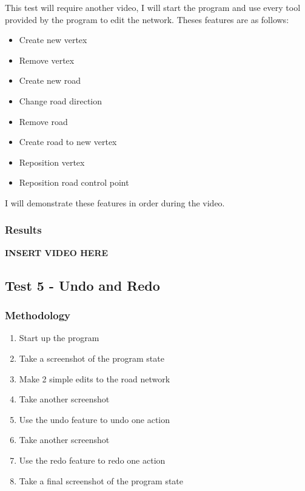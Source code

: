             This test will require another video, I will start the program and use every tool provided by the program to edit the network. Theses features are as follows:

            \begin{itemize}
                \item Create new vertex
                \item Remove vertex
                \item Create new road
                \item Change road direction
                \item Remove road
                \item Create road to new vertex
                \item Reposition vertex
                \item Reposition road control point
            \end{itemize}

            I will demonstrate these features in order during the video.

        \subsubsection{Results}

            \textbf{INSERT VIDEO HERE}

    \subsection{Test 5 - Undo and Redo}

        \subsubsection{Methodology}

            \begin{enumerate}
                \item Start up the program
                \item Take a screenshot of the program state
                \item Make 2 simple edits to the road network
                \item Take another screenshot
                \item Use the undo feature to undo one action
                \item Take another screenshot
                \item Use the redo feature to redo one action
                \item Take a final screenshot of the program state
            \end{enumerate}


